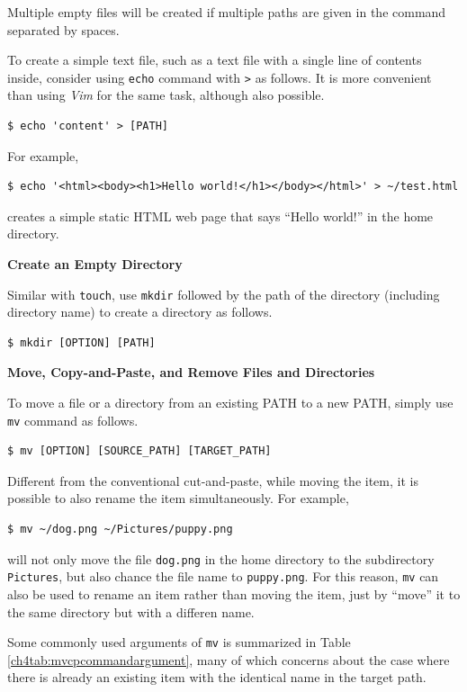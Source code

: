 Multiple empty files will be created if multiple paths are given in the command separated by spaces.

To create a simple text file, such as a text file with a single line of contents inside, consider using \verb|echo| command with \verb|>| as follows. It is more convenient than using \textit{Vim} for the same task, although also possible.
\begin{lstlisting}
$ echo 'content' > [PATH]
\end{lstlisting}
For example,
\begin{lstlisting}
$ echo '<html><body><h1>Hello world!</h1></body></html>' > ~/test.html
\end{lstlisting}
creates a simple static HTML web page that says ``Hello world!'' in the home directory.

\textbf{Create an Empty Directory}

Similar with \verb|touch|, use \verb|mkdir| followed by the path of the directory (including directory name) to create a directory as follows.
\begin{lstlisting}
$ mkdir [OPTION] [PATH]
\end{lstlisting}

\textbf{Move, Copy-and-Paste, and Remove Files and Directories}

To move a file or a directory from an existing PATH to a new PATH, simply use \verb|mv| command as follows.
\begin{lstlisting}
$ mv [OPTION] [SOURCE_PATH] [TARGET_PATH]
\end{lstlisting}
Different from the conventional cut-and-paste, while moving the item, it is possible to also rename the item simultaneously. For example,
\begin{lstlisting}
$ mv ~/dog.png ~/Pictures/puppy.png
\end{lstlisting}
will not only move the file \verb|dog.png| in the home directory to the subdirectory \verb|Pictures|, but also chance the file name to \verb|puppy.png|. For this reason, \verb|mv| can also be used to rename an item rather than moving the item, just by ``move'' it to the same directory but with a differen name.

Some commonly used arguments of \verb|mv| is summarized in Table \ref{ch4tab:mvcpcommandargument}, many of which concerns about the case where there is already an existing item with the identical name in the target path.

